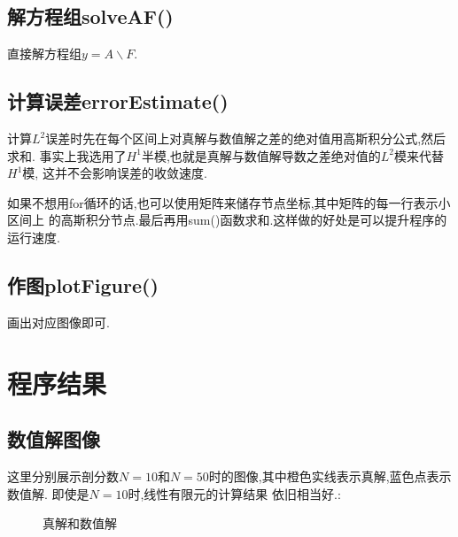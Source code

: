 \documentclass[11pt,reqno]{article}
\numberwithin{equation}{section}
\begin{document}
\subsection{解方程组solveAF()}

直接解方程组$y=A\backslash F$.

\subsection{计算误差errorEstimate()}
计算$L^2$误差时先在每个区间上对真解与数值解之差的绝对值用高斯积分公式,然后求和.
事实上我选用了$H^1$半模,也就是真解与数值解导数之差绝对值的$L^2$模来代替$H^1$模,
这并不会影响误差的收敛速度.

如果不想用for循环的话,也可以使用矩阵来储存节点坐标,其中矩阵的每一行表示小区间上
的高斯积分节点.最后再用sum()函数求和.这样做的好处是可以提升程序的运行速度.

\subsection{作图plotFigure()}
画出对应图像即可.

\newpage

\section{程序结果}
\subsection{数值解图像}
这里分别展示剖分数$N=10$和$N=50$时的图像,其中橙色实线表示真解,蓝色点表示数值解. 
即使是$N=10$时,线性有限元的计算结果   依旧相当好.:\\[-20pt]
\begin{figure}[h]
	\centering
	  \caption{真解和数值解}
	\label{fig:subfigure}
\end{figure}
\end{document}
